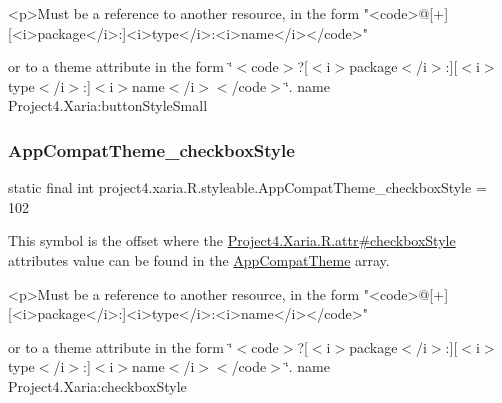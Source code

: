\begin{DoxyVerb}      <p>Must be a reference to another resource, in the form "<code>@[+][<i>package</i>:]<i>type</i>:<i>name</i></code>"
\end{DoxyVerb}
 or to a theme attribute in the form \char`\"{}$<$code$>$?\mbox{[}$<$i$>$package$<$/i$>$\+:\mbox{]}\mbox{[}$<$i$>$type$<$/i$>$\+:\mbox{]}$<$i$>$name$<$/i$>$$<$/code$>$\char`\"{}.  name Project4.\+Xaria\+:button\+Style\+Small \mbox{\label{classproject4_1_1xaria_1_1R_1_1styleable_afad6cf2b0ee135e8a4df052b6eb4d916}} 
\subsubsection{\texorpdfstring{App\+Compat\+Theme\+\_\+checkbox\+Style}{AppCompatTheme\_checkboxStyle}}
{\footnotesize\ttfamily static final int project4.\+xaria.\+R.\+styleable.\+App\+Compat\+Theme\+\_\+checkbox\+Style = 102\hspace{0.3cm}{\ttfamily [static]}}

This symbol is the offset where the \hyperlink{}{Project4.\+Xaria.\+R.\+attr\#checkbox\+Style} attribute\textquotesingle{}s value can be found in the \hyperlink{classproject4_1_1xaria_1_1R_1_1styleable_aad8bec413e2350f9404e6ff0e831a85d}{App\+Compat\+Theme} array.

\begin{DoxyVerb}      <p>Must be a reference to another resource, in the form "<code>@[+][<i>package</i>:]<i>type</i>:<i>name</i></code>"
\end{DoxyVerb}
 or to a theme attribute in the form \char`\"{}$<$code$>$?\mbox{[}$<$i$>$package$<$/i$>$\+:\mbox{]}\mbox{[}$<$i$>$type$<$/i$>$\+:\mbox{]}$<$i$>$name$<$/i$>$$<$/code$>$\char`\"{}.  name Project4.\+Xaria\+:checkbox\+Style \mbox{\label{classproject4_1_1xaria_1_1R_1_1styleable_a22209fcca0bd05c9f68f33c77180738e}} 
